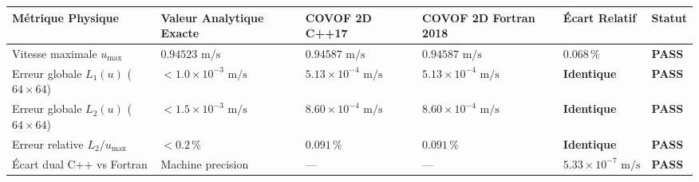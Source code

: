 \documentclass[
  10pt,
]{article}
\newcounter{none} %
\begin{document}
{\def\LTcaptype{none} %
\begin{longtable}[]{@{}
  >{\raggedright\arraybackslash}p{}
  >{\centering\arraybackslash}p{}
  >{\centering\arraybackslash}p{}
  >{\centering\arraybackslash}p{}
  >{\centering\arraybackslash}p{}
  >{\centering\arraybackslash}p{}@{}}
\toprule\noalign{}
\begin{minipage}[b]{\linewidth}\raggedright
Métrique Physique
\end{minipage} & \begin{minipage}[b]{\linewidth}\centering
Valeur Analytique Exacte
\end{minipage} & \begin{minipage}[b]{\linewidth}\centering
COVOF 2D C++17
\end{minipage} & \begin{minipage}[b]{\linewidth}\centering
COVOF 2D Fortran 2018
\end{minipage} & \begin{minipage}[b]{\linewidth}\centering
Écart Relatif
\end{minipage} & \begin{minipage}[b]{\linewidth}\centering
Statut
\end{minipage} \\
\midrule\noalign{}
\endhead
\bottomrule\noalign{}
\endlastfoot
Vitesse maximale \(u_{\max}\) & \(0.94523\text{ m/s}\) &
\textbf{\(0.94587\text{ m/s}\)} & \textbf{\(0.94587\text{ m/s}\)} &
\textbf{\(0.068\,\%\)} & \textbf{PASS} \\
Erreur globale \(L_1(u)\) (\(64\times 64\)) &
\(< 1.0 \times 10^{-3}\text{ m/s}\) &
\textbf{\(5.13 \times 10^{-4}\text{ m/s}\)} &
\textbf{\(5.13 \times 10^{-4}\text{ m/s}\)} & \textbf{Identique} &
\textbf{PASS} \\
Erreur globale \(L_2(u)\) (\(64\times 64\)) &
\(< 1.5 \times 10^{-3}\text{ m/s}\) &
\textbf{\(8.60 \times 10^{-4}\text{ m/s}\)} &
\textbf{\(8.60 \times 10^{-4}\text{ m/s}\)} & \textbf{Identique} &
\textbf{PASS} \\
Erreur relative \(L_2 / u_{\max}\) & \(< 0.2\,\%\) &
\textbf{\(0.091\,\%\)} & \textbf{\(0.091\,\%\)} & \textbf{Identique} &
\textbf{PASS} \\
Écart dual C++ vs Fortran & Machine precision & --- & --- &
\textbf{\(5.33 \times 10^{-7}\text{ m/s}\)} & \textbf{PASS} \\
\end{longtable}
}
\end{document}
